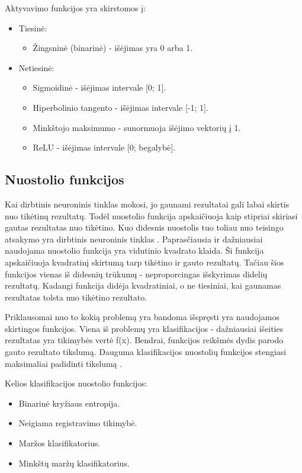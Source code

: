 \documentclass{VUMIFPSkursinis}
\begin{document}
Aktyvavimo funkcijos yra skirstomos į:
\begin{itemize}
\item Tiesinė: 
\begin{itemize}
\item Žingsninė (binarinė) - išėjimas yra 0 arba 1.
\end{itemize}
\item Netiesinė: 
\begin{itemize}
\item Sigmoidinė - išėjimas intervale [0; 1].
\item Hiperbolinio tangento - išėjimas intervale [-1; 1].
\item Minkštojo maksimumo - sunormuoja išėjimo vektorių į 1.
\item ReLU - išėjimas intervale [0; begalybė].
\end{itemize}
\end{itemize}


\subsection{Nuostolio funkcijos}
Kai dirbtinis neuroninis tinklas mokosi, jo gaunami rezultatai gali labai skirtis nuo tikėtinų rezultatų. Todėl nuostolio funkcija apskaičiuoja kaip stipriai
skiriasi gautas rezultatas nuo tikėtino. Kuo didesnis nuostolis tuo toliau nuo teisingo atsakymo yra dirbtinis neuroninis tinklas \cite{Cameron-loss-fun}.
Paprasčiausia ir dažniausiai naudojama nuostolio funkcija yra vidutinio kvadrato klaida. Ši funkcija apskaičiuoja kvadratinį skirtumą tarp tikėtino 
ir gauto rezultatų. Tačiau šios funkcijos vienas iš didesnių trūkumų - neproporcingas išskyrimas didelių rezultatų. Kadangi funkcija didėja kvadratiniai,
o ne tiesiniai, kai gaunamas rezultatas tolsta nuo tikėtino rezultato.

Priklausomai nuo to kokią problemą yra bandoma išspręsti yra naudojamos skirtingos funkcijos. Viena iš problemų yra klasifikacijos - dažniausiai išeities
rezultatas yra tikimybės vertė f(x). Bendrai, funkcijos reikšmės dydis parodo gauto rezultato tikslumą. Dauguma klasifikacijos nuostolių funkcijos stengiasi
maksimaliai padidinti tikslumą \cite{clas-loss-2017}. 


Kelios klasifikacijos nuostolio funkcijos:
\begin{itemize}
\item Binarinė kryžiaus entropija.
\item Neigiama registravimo tikimybė.
\item Maržos klasifikatorius.
\item Minkštų maržų klasifikatorius.
\end{itemize}
\end{document}
